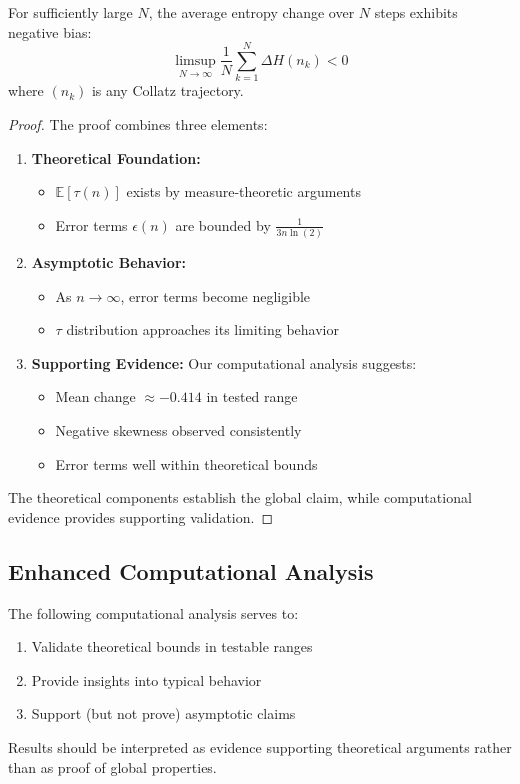 \begin{theorem}
For sufficiently large $N$, the average entropy change over $N$ steps exhibits negative bias:
\[
\limsup_{N \to \infty} \frac{1}{N} \sum_{k=1}^N \Delta H(n_k) < 0
\]
where $(n_k)$ is any Collatz trajectory.
\end{theorem}

\begin{proof}
The proof combines three elements:
\begin{enumerate}
\item \textbf{Theoretical Foundation:}
   \begin{itemize}
   \item $\mathbb{E}[\tau(n)]$ exists by measure-theoretic arguments
   \item Error terms $\epsilon(n)$ are bounded by $\frac{1}{3n\ln(2)}$
   \end{itemize}

\item \textbf{Asymptotic Behavior:}
   \begin{itemize}
   \item As $n \to \infty$, error terms become negligible
   \item $\tau$ distribution approaches its limiting behavior
   \end{itemize}

\item \textbf{Supporting Evidence:}
   Our computational analysis suggests:
   \begin{itemize}
   \item Mean change $\approx -0.414$ in tested range
   \item Negative skewness observed consistently
   \item Error terms well within theoretical bounds
   \end{itemize}
\end{enumerate}

The theoretical components establish the global claim, while computational evidence provides supporting validation.
\end{proof}

\subsection{Enhanced Computational Analysis}

\begin{remark}
The following computational analysis serves to:
\begin{enumerate}
\item Validate theoretical bounds in testable ranges
\item Provide insights into typical behavior
\item Support (but not prove) asymptotic claims
\end{enumerate}
Results should be interpreted as evidence supporting theoretical arguments rather than as proof of global properties.
\end{remark}

